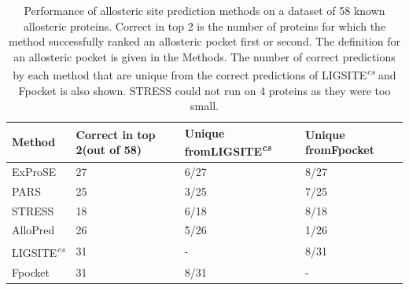 \begin{table}
\centering

\begin{footnotesize}
\begin{tabular}{ p{3cm} p{3cm} p{3cm} p{3cm} }
\hline
\textbf{Method} & \textbf{Correct in top 2\newline (out of 58)} & \textbf{Unique from\newline LIGSITE\textsuperscript{\it cs}} & \textbf{Unique from\newline Fpocket} \\
\hline
ExProSE                         & 27 & 6/27 & 8/27 \\
PARS                            & 25 & 3/25 & 7/25 \\
STRESS                          & 18 & 6/18 & 8/18 \\
AlloPred                        & 26 & 5/26 & 1/26 \\
LIGSITE\textsuperscript{\it cs} & 31 & -    & 8/31 \\
Fpocket                         & 31 & 8/31 & -    \\
\hline
\end{tabular}
\end{footnotesize}

\caption[Performance of allosteric site prediction methods on a dataset of 58 known allosteric proteins - summary]
{Performance of allosteric site prediction methods on a dataset of 58 known allosteric proteins.
Correct in top 2 is the number of proteins for which the method successfully ranked an allosteric pocket first or second.
The definition for an allosteric pocket is given in the Methods.
The number of correct predictions by each method that are unique from the correct predictions of LIGSITE\textsuperscript{\it cs} and Fpocket is also shown.
STRESS could not run on 4 proteins as they were too small.}

\label{tab:allosteric_methods}
\end{table}


